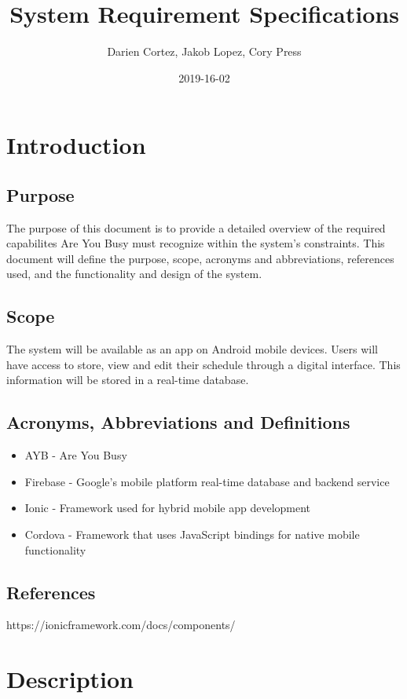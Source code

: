 \documentclass{article}
\title{System Requirement Specifications}
\date{2019-16-02}
\author{Darien Cortez, Jakob Lopez, Cory Press}
\begin{document}
  \maketitle
  \newpage

  \tableofcontents

  \section{Introduction}
  \subsection{Purpose} 
  The purpose of this document is to provide a detailed overview of the required capabilites 
  Are You Busy must recognize within the system's constraints. This document will define the 
  purpose, scope, acronyms and abbreviations, references used, and the functionality and design 
  of the system.   
  \subsection{Scope}  
  The system will be available as an app on Android mobile devices. Users will have access to 
  store, view and edit their schedule through a digital interface. This information will be stored in a 
  real-time database.
  \subsection{Acronyms, Abbreviations and Definitions}
  \begin{itemize}
    \item AYB - Are You Busy
    \item Firebase - Google's mobile platform real-time database and backend service
    \item Ionic - Framework used for hybrid mobile app development
    \item Cordova - Framework that uses JavaScript bindings for native mobile functionality
  \end{itemize}
  \subsection{References}
  https://ionicframework.com/docs/components/


  \section{Description}
\end{document}
